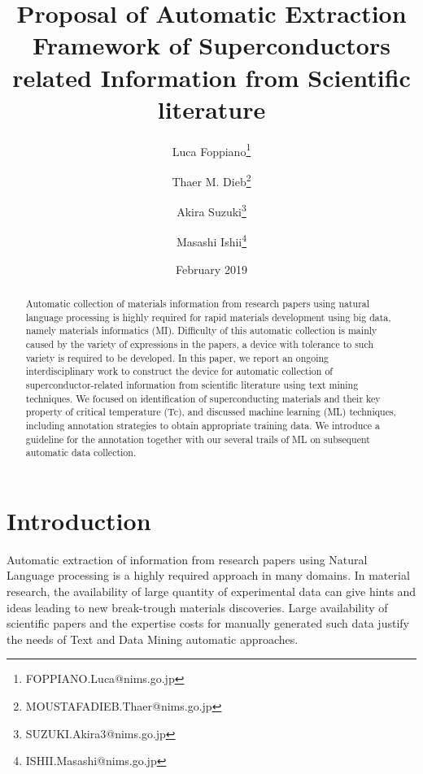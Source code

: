\documentclass{article}
\title{Proposal of Automatic Extraction Framework of Superconductors related Information from Scientific literature}
\author[1]{Luca Foppiano\thanks{FOPPIANO.Luca@nims.go.jp}}
\author[1]{Thaer M. Dieb\thanks{MOUSTAFADIEB.Thaer@nims.go.jp}}
\author[1]{Akira Suzuki\thanks{SUZUKI.Akira3@nims.go.jp}}
\author[1]{Masashi Ishii\thanks{ISHII.Masashi@nims.go.jp}}
\affil[1]{Research and Services Division of Materials Data and Integrated System (MaDIS), National Institute for Materials Science (NIMS), 1-2-1 Sengen, Tsukuba, Ibaraki 305-0047, Japan}
\date{February 2019}
\begin{document}
\maketitle

\begin{abstract}
Automatic collection of materials information from research papers using natural language processing is highly required for rapid materials development using big data, namely materials informatics (MI). Difficulty of this automatic collection is mainly caused by the variety of expressions in the papers, a device with tolerance to such variety is required to be developed. 
In this paper, we report an ongoing interdisciplinary work to construct the device for automatic collection of superconductor-related information from scientific literature using text mining techniques. We focused on identification of superconducting materials and their key property of critical temperature (Tc), and discussed machine learning (ML) techniques, including annotation strategies to obtain appropriate training data. We introduce a guideline for the annotation together with our several trails of ML on subsequent automatic data collection.
\end{abstract}

\pagebreak

\tableofcontents

\pagebreak



\section{Introduction}

Automatic extraction of information from research papers using Natural Language processing is a highly required approach in many domains. In material research, the availability of large quantity of experimental data can give hints and ideas leading to new break-trough materials discoveries. Large availability of scientific papers and the expertise costs for manually generated such data justify the needs of Text and Data Mining automatic approaches.
\end{document}
